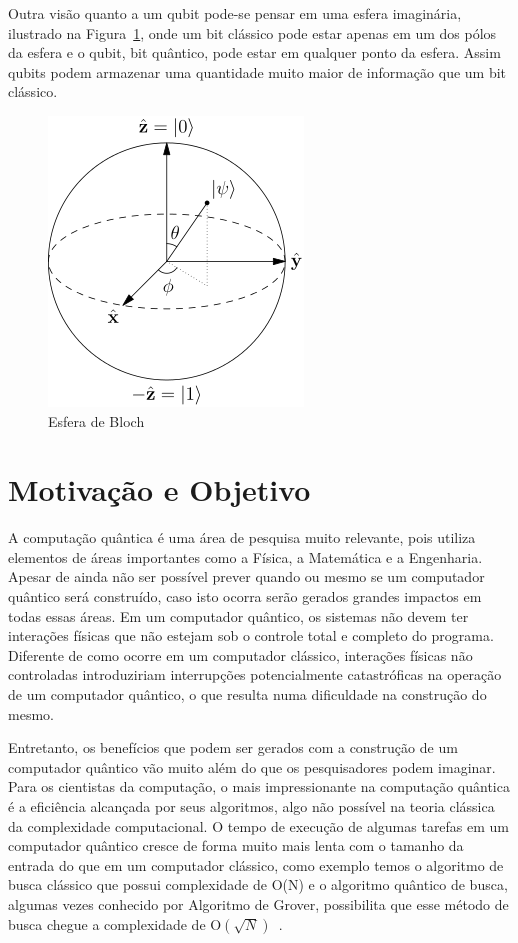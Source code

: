 \documentclass[a4paper, 12pt, oneside]{book}
\begin{document}
Outra visão quanto a um qubit pode-se pensar em uma esfera imaginária, ilustrado na Figura~\ref{fig:bloch}, onde um bit clássico pode estar apenas em um dos pólos da esfera e o qubit, bit quântico, pode estar em qualquer ponto da esfera. Assim qubits podem armazenar uma quantidade muito maior de informação que um bit clássico.

\begin{figure}[H]
\centering
\includegraphics[scale=0.5]{bloch_sphere.png}
\caption{Esfera de Bloch}
\label{fig:bloch}
\end{figure}

\section{Motivação e Objetivo}

A computação quântica é uma área de pesquisa muito relevante, pois utiliza elementos de áreas importantes como a Física, a Matemática e a Engenharia. Apesar de ainda não ser possível prever quando ou mesmo se um computador quântico será construído, caso isto ocorra serão gerados grandes impactos em todas essas áreas. Em um computador quântico, os sistemas não devem ter interações físicas que não estejam sob o controle total e completo do programa. Diferente de como ocorre em um computador clássico, interações físicas não controladas introduziriam interrupções potencialmente catastróficas na operação de um computador quântico, o que resulta numa dificuldade na construção do mesmo. 

Entretanto, os benefícios que podem ser gerados com a construção de um computador quântico vão muito além do que os pesquisadores podem imaginar. Para os cientistas da computação, o mais impressionante na computação quântica é a eficiência alcançada por seus algoritmos, algo não possível na teoria clássica da complexidade computacional. O tempo de execução de algumas tarefas em um computador quântico cresce de forma muito mais lenta com o tamanho da entrada do que em um computador clássico, como exemplo temos o algoritmo de busca clássico que possui complexidade de O(N) e o algoritmo quântico de busca, algumas vezes conhecido por Algoritmo de Grover, possibilita que esse método de busca chegue a complexidade de O$(\sqrt{N})$~\cite{grover}. 
\end{document}
